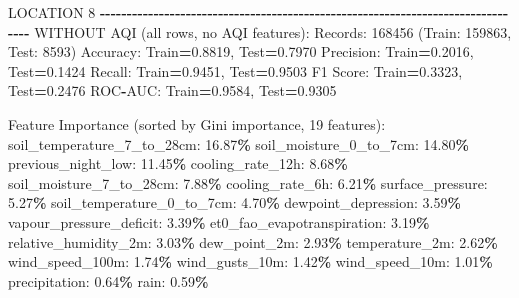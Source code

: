\documentclass[
  letterpaper,
  DIV=11,
  numbers=noendperiod]{scrartcl}
\newenvironment{Shaded}{\begin{snugshade}}{\end{snugshade}}
\newcommand{\BuiltInTok}[1]{#1}
\newcommand{\DecValTok}[1]{\textcolor[rgb]{0.00,0.00,0.81}{#1}}
\newcommand{\FloatTok}[1]{\textcolor[rgb]{0.00,0.00,0.81}{#1}}
\newcommand{\NormalTok}[1]{#1}
\newcommand{\OperatorTok}[1]{\textcolor[rgb]{0.81,0.36,0.00}{\textbf{#1}}}
\begin{document}
\begin{Shaded}
\begin{Highlighting}[]
\NormalTok{LOCATION }\DecValTok{8}
\OperatorTok{{-}{-}{-}{-}{-}{-}{-}{-}{-}{-}{-}{-}{-}{-}{-}{-}{-}{-}{-}{-}{-}{-}{-}{-}{-}{-}{-}{-}{-}{-}{-}{-}{-}{-}{-}{-}{-}{-}{-}{-}{-}{-}{-}{-}{-}{-}{-}{-}{-}{-}{-}{-}{-}{-}{-}{-}{-}{-}{-}{-}{-}{-}{-}{-}{-}{-}{-}{-}{-}{-}{-}{-}{-}{-}{-}{-}{-}{-}{-}{-}}
\NormalTok{WITHOUT AQI (}\BuiltInTok{all}\NormalTok{ rows, no AQI features):}
\NormalTok{  Records: }\DecValTok{168456}\NormalTok{ (Train: }\DecValTok{159863}\NormalTok{, Test: }\DecValTok{8593}\NormalTok{)}
\NormalTok{  Accuracy: Train}\OperatorTok{=}\FloatTok{0.8819}\NormalTok{, Test}\OperatorTok{=}\FloatTok{0.7970}
\NormalTok{  Precision: Train}\OperatorTok{=}\FloatTok{0.2016}\NormalTok{, Test}\OperatorTok{=}\FloatTok{0.1424}
\NormalTok{  Recall: Train}\OperatorTok{=}\FloatTok{0.9451}\NormalTok{, Test}\OperatorTok{=}\FloatTok{0.9503}
\NormalTok{  F1 Score: Train}\OperatorTok{=}\FloatTok{0.3323}\NormalTok{, Test}\OperatorTok{=}\FloatTok{0.2476}
\NormalTok{  ROC}\OperatorTok{{-}}\NormalTok{AUC: Train}\OperatorTok{=}\FloatTok{0.9584}\NormalTok{, Test}\OperatorTok{=}\FloatTok{0.9305}

\NormalTok{  Feature Importance (}\BuiltInTok{sorted}\NormalTok{ by Gini importance, }\DecValTok{19}\NormalTok{ features):}
\NormalTok{    soil\_temperature\_7\_to\_28cm: }\FloatTok{16.87}\OperatorTok{\%}
\NormalTok{    soil\_moisture\_0\_to\_7cm: }\FloatTok{14.80}\OperatorTok{\%}
\NormalTok{    previous\_night\_low: }\FloatTok{11.45}\OperatorTok{\%}
\NormalTok{    cooling\_rate\_12h: }\FloatTok{8.68}\OperatorTok{\%}
\NormalTok{    soil\_moisture\_7\_to\_28cm: }\FloatTok{7.88}\OperatorTok{\%}
\NormalTok{    cooling\_rate\_6h: }\FloatTok{6.21}\OperatorTok{\%}
\NormalTok{    surface\_pressure: }\FloatTok{5.27}\OperatorTok{\%}
\NormalTok{    soil\_temperature\_0\_to\_7cm: }\FloatTok{4.70}\OperatorTok{\%}
\NormalTok{    dewpoint\_depression: }\FloatTok{3.59}\OperatorTok{\%}
\NormalTok{    vapour\_pressure\_deficit: }\FloatTok{3.39}\OperatorTok{\%}
\NormalTok{    et0\_fao\_evapotranspiration: }\FloatTok{3.19}\OperatorTok{\%}
\NormalTok{    relative\_humidity\_2m: }\FloatTok{3.03}\OperatorTok{\%}
\NormalTok{    dew\_point\_2m: }\FloatTok{2.93}\OperatorTok{\%}
\NormalTok{    temperature\_2m: }\FloatTok{2.62}\OperatorTok{\%}
\NormalTok{    wind\_speed\_100m: }\FloatTok{1.74}\OperatorTok{\%}
\NormalTok{    wind\_gusts\_10m: }\FloatTok{1.42}\OperatorTok{\%}
\NormalTok{    wind\_speed\_10m: }\FloatTok{1.01}\OperatorTok{\%}
\NormalTok{    precipitation: }\FloatTok{0.64}\OperatorTok{\%}
\NormalTok{    rain: }\FloatTok{0.59}\OperatorTok{\%}


\end{Highlighting}
\end{Shaded}
\end{document}
